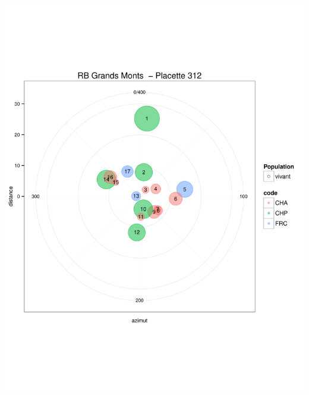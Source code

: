 \documentclass[a4paper]{book}\usepackage[]{graphicx}\usepackage[]{color}
\makeatletter
\def\maxwidth{ %
  \ifdim\Gin@nat@width>\linewidth
    \linewidth
  \else
    \Gin@nat@width
  \fi
}
\newenvironment{knitrout}{}{} %
\makeatother
\begin{document}
\begin{knitrout}
{\centering \includegraphics[width=\maxwidth]{Figures/PlanArbres-29} 

}





\end{knitrout}
\end{document}
